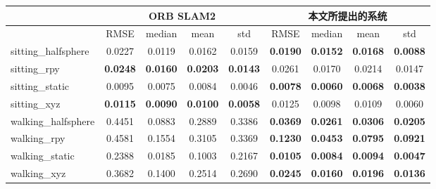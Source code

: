 \begin{table}[!htbp]
    \label{tab:RPET}
    \centering
    \footnotesize%
    \setlength{\tabcolsep}{8pt}%
    \renewcommand{\arraystretch}{1.3}%
    \begin{tabular}{l|cccc|cccc}
        \hline
        & \multicolumn{4}{c|}{ORB SLAM2}                                         & \multicolumn{4}{c}{本文所提出的系统}                                        \\ \hline
        & RMSE            & median          & mean            & std             & RMSE            & median          & mean            & std             \\ \hline
        sitting\_halfsphere & 0.0227          & 0.0119          & 0.0162          & 0.0159          & \textbf{0.0190} & \textbf{0.0152} & \textbf{0.0168} & \textbf{0.0088} \\ \hline
        sitting\_rpy        & \textbf{0.0248} & \textbf{0.0160} & \textbf{0.0203} & \textbf{0.0143} & 0.0261          & 0.0170          & 0.0214          & 0.0147          \\ \hline
        sitting\_static     & 0.0095          & 0.0075          & 0.0084          & 0.0046          & \textbf{0.0078} & \textbf{0.0060} & \textbf{0.0068} & \textbf{0.0038} \\ \hline
        sitting\_xyz        & \textbf{0.0115} & \textbf{0.0090} & \textbf{0.0100} & \textbf{0.0058} & 0.0125          & 0.0098          & 0.0109          & 0.0060          \\ \hline
        walking\_halfsphere & 0.4451          & 0.0883          & 0.2889          & 0.3386          & \textbf{0.0369} & \textbf{0.0261} & \textbf{0.0306} & \textbf{0.0205} \\ \hline
        walking\_rpy        & 0.4581          & 0.1554          & 0.3105          & 0.3369          & \textbf{0.1230} & \textbf{0.0453} & \textbf{0.0795} & \textbf{0.0921} \\ \hline
        walking\_static     & 0.2388          & 0.0185          & 0.1003          & 0.2167          & \textbf{0.0105} & \textbf{0.0084} & \textbf{0.0094} & \textbf{0.0047} \\ \hline
        walking\_xyz        & 0.3682          & 0.1400          & 0.2514          & 0.2690          & \textbf{0.0245} & \textbf{0.0160} & \textbf{0.0196} & \textbf{0.0136} \\ \hline
        \hline
    \end{tabular}
\end{table}

